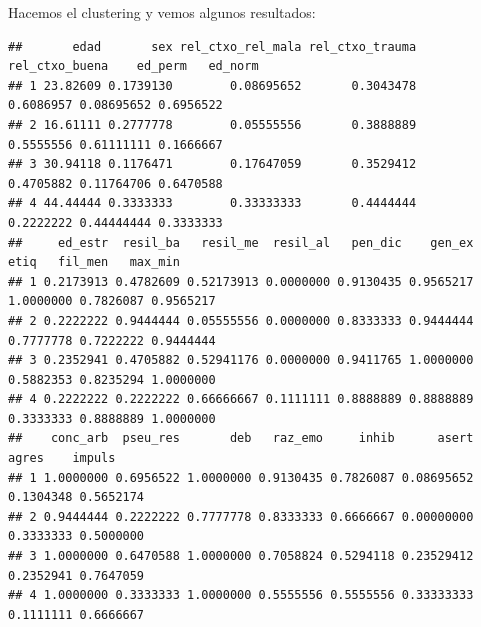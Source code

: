 \documentclass[]{article}
\newenvironment{Shaded}{\begin{snugshade}}{\end{snugshade}}
\newcommand{\KeywordTok}[1]{\textcolor[rgb]{0.13,0.29,0.53}{\textbf{#1}}}
\newcommand{\DataTypeTok}[1]{\textcolor[rgb]{0.13,0.29,0.53}{#1}}
\newcommand{\DecValTok}[1]{\textcolor[rgb]{0.00,0.00,0.81}{#1}}
\newcommand{\StringTok}[1]{\textcolor[rgb]{0.31,0.60,0.02}{#1}}
\newcommand{\CommentTok}[1]{\textcolor[rgb]{0.56,0.35,0.01}{\textit{#1}}}
\newcommand{\OperatorTok}[1]{\textcolor[rgb]{0.81,0.36,0.00}{\textbf{#1}}}
\newcommand{\NormalTok}[1]{#1}
\begin{document}
Hacemos el clustering y vemos algunos resultados:

\begin{Shaded}
\end{Shaded}

\begin{verbatim}
##       edad       sex rel_ctxo_rel_mala rel_ctxo_trauma rel_ctxo_buena    ed_perm   ed_norm
## 1 23.82609 0.1739130        0.08695652       0.3043478      0.6086957 0.08695652 0.6956522
## 2 16.61111 0.2777778        0.05555556       0.3888889      0.5555556 0.61111111 0.1666667
## 3 30.94118 0.1176471        0.17647059       0.3529412      0.4705882 0.11764706 0.6470588
## 4 44.44444 0.3333333        0.33333333       0.4444444      0.2222222 0.44444444 0.3333333
##     ed_estr  resil_ba   resil_me  resil_al   pen_dic    gen_ex      etiq   fil_men   max_min
## 1 0.2173913 0.4782609 0.52173913 0.0000000 0.9130435 0.9565217 1.0000000 0.7826087 0.9565217
## 2 0.2222222 0.9444444 0.05555556 0.0000000 0.8333333 0.9444444 0.7777778 0.7222222 0.9444444
## 3 0.2352941 0.4705882 0.52941176 0.0000000 0.9411765 1.0000000 0.5882353 0.8235294 1.0000000
## 4 0.2222222 0.2222222 0.66666667 0.1111111 0.8888889 0.8888889 0.3333333 0.8888889 1.0000000
##    conc_arb  pseu_res       deb   raz_emo     inhib      asert     agres    impuls
## 1 1.0000000 0.6956522 1.0000000 0.9130435 0.7826087 0.08695652 0.1304348 0.5652174
## 2 0.9444444 0.2222222 0.7777778 0.8333333 0.6666667 0.00000000 0.3333333 0.5000000
## 3 1.0000000 0.6470588 1.0000000 0.7058824 0.5294118 0.23529412 0.2352941 0.7647059
## 4 1.0000000 0.3333333 1.0000000 0.5555556 0.5555556 0.33333333 0.1111111 0.6666667
\end{verbatim}

\begin{Shaded}
\end{Shaded}
\end{document}
